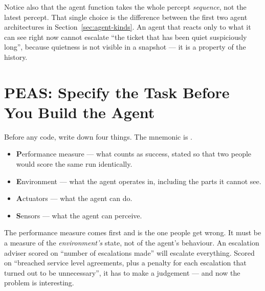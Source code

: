 \begin{conceptbox}
Notice also that the agent function takes the whole percept \emph{sequence}, not
the latest percept. That single choice is the difference between the first two
agent architectures in Section~\ref{sec:agent-kinds}. An agent that reacts only to
what it can see right now cannot escalate ``the ticket that has been quiet
suspiciously long'', because quietness is not visible in a snapshot --- it is a
property of the history.
\end{conceptbox}

\section{PEAS: Specify the Task Before You Build the Agent}

Before any code, write down four things. The mnemonic is .

\begin{itemize}[leftmargin=2.4em, itemsep=3pt, topsep=4pt]
  \item \textbf{P}erformance measure --- what counts as success, stated so that two
        people would score the same run identically.
  \item \textbf{E}nvironment --- what the agent operates in, including the parts it
        cannot see.
  \item \textbf{A}ctuators --- what the agent can do.
  \item \textbf{S}ensors --- what the agent can perceive.
\end{itemize}

The performance measure comes first and is the one people get wrong. It must be a
measure of the \emph{environment's} state, not of the agent's behaviour. An
escalation adviser scored on ``number of escalations made'' will escalate
everything. Scored on ``breached service level agreements, plus a penalty for each
escalation that turned out to be unnecessary'', it has to make a judgement --- and
now the problem is interesting.

